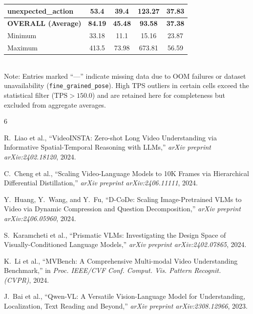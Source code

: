 \documentclass[conference]{IEEEtran}
\begin{document}
\begin{table}[!t]
\begin{tabular}{lcccc}
    unexpected\_action         & 53.4   & 39.4   & 123.27 & 37.83 \\
    \midrule
    \textbf{OVERALL (Average)} & \textbf{84.19} & \textbf{45.48}
                               & \textbf{93.58} & \textbf{37.38} \\
    Minimum                    & 33.18  & 11.1   & 15.16  & 23.87 \\
    Maximum                    & 413.5  & 73.98  & 673.81 & 56.59 \\
    \bottomrule
  \end{tabular}
  \smallskip\\
  \small{Note: Entries marked ``---'' indicate missing data due to OOM failures
         or dataset unavailability (\texttt{fine\_grained\_pose}).
         High TPS outliers in certain cells exceed the statistical
         filter ($\text{TPS}>150.0$) and are retained here for
         completeness but excluded from aggregate averages.}
\end{table}

\balance  %


\begin{thebibliography}{6}

R.~Liao et al.,
``VideoINSTA: Zero-shot Long Video Understanding via Informative
Spatial-Temporal Reasoning with LLMs,''
\textit{arXiv preprint arXiv:2402.18120}, 2024.

C.~Cheng et al.,
``Scaling Video-Language Models to 10K Frames via Hierarchical
Differential Distillation,''
\textit{arXiv preprint arXiv:2406.11111}, 2024.

Y.~Huang, Y.~Wang, and Y.~Fu,
``D-CoDe: Scaling Image-Pretrained VLMs to Video via Dynamic Compression
and Question Decomposition,''
\textit{arXiv preprint arXiv:2406.05960}, 2024.

S.~Karamcheti et al.,
``Prismatic VLMs: Investigating the Design Space of Visually-Conditioned
Language Models,''
\textit{arXiv preprint arXiv:2402.07865}, 2024.

K.~Li et al.,
``MVBench: A Comprehensive Multi-modal Video Understanding Benchmark,''
in \textit{Proc. IEEE/CVF Conf. Comput. Vis. Pattern Recognit. (CVPR)},
2024.

J.~Bai et al.,
``Qwen-VL: A Versatile Vision-Language Model for Understanding,
Localization, Text Reading and Beyond,''
\textit{arXiv preprint arXiv:2308.12966}, 2023.

\end{thebibliography}
\end{document}
